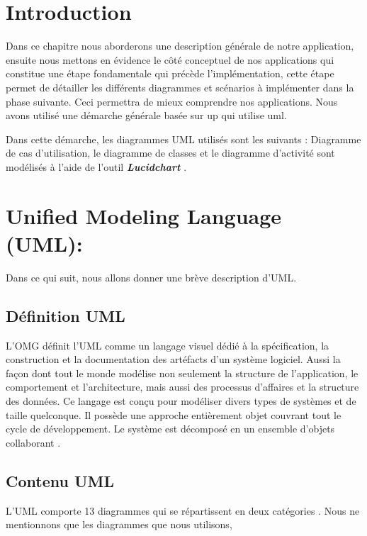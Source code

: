  \section*{Introduction}

  
Dans ce chapitre nous aborderons une description générale de notre application, ensuite nous mettons en évidence le côté conceptuel de nos applications qui constitue une étape fondamentale qui précède l’implémentation, cette étape permet de détailler les différents diagrammes et scénarios à implémenter dans la phase suivante. Ceci permettra de mieux comprendre nos applications. Nous avons utilisé une démarche générale basée sur \ac{up} qui utilise  \ac{uml}. 

Dans cette démarche, les diagrammes UML utilisés sont les suivants : Diagramme de cas d’utilisation, le diagramme de classes et le diagramme d'activité sont modélisés à l’aide de l’outil \textit{\textbf{Lucidchart}} .



 \section{Unified Modeling Language (UML):}
 Dans ce qui suit, nous allons donner une brève description d’UML.
 \subsection{ Définition UML }
 L’OMG définit l’UML comme un langage visuel dédié à la spécification, la construction et la documentation des artéfacts d’un système logiciel. Aussi la façon dont tout le monde modélise non seulement la structure de l’application, le comportement et l’architecture, mais aussi des processus d’affaires et la structure des données. Ce langage est conçu pour modéliser divers types de systèmes et de taille quelconque. Il possède une approche entièrement objet couvrant tout le cycle de développement. Le système est décomposé en un ensemble d’objets collaborant \parencite{uml}.
 
 \subsection{Contenu UML}
 
 L’UML comporte 13 diagrammes qui se répartissent en deux catégories \parencite{uml}. Nous ne mentionnons que les diagrammes que nous utilisons, 
 
